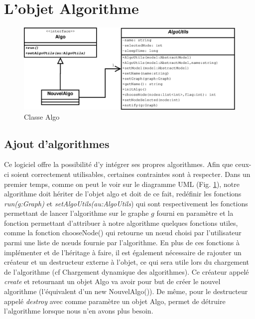 \documentclass[11pt,a4paper]{article}
\begin{document}
	\newpage
	\section{L'objet Algorithme}
		\begin{figure}[htbp]
			\begin{center}
				\includegraphics[scale=0.5]{class_algo.eps}
			\end{center}
			\caption{Classe Algo}
			\label{img_algo_class}
		\end{figure}	
				
		\subsection{Ajout d'algorithmes}
			Ce logiciel offre la possibilité d'y intégrer ses propres algorithmes. Afin que ceux-ci soient correctement utilisables, certaines contraintes sont à respecter. Dans un premier temps, comme on peut le voir sur le diagramme UML (Fig. \ref{img_algo_class}), notre algorithme doit hériter de l'objet algo et doit de ce fait, redéfinir les fonctions \textit{run(g:Graph)} et \textit{setAlgoUtils(au:AlgoUtils}) qui sont respectivement les fonctions permettant de lancer l'algorithme sur le graphe $g$ fourni en paramètre et la fonction permettant d'attribuer à notre algorithme quelques fonctions utiles, comme la fonction chooseNode() qui retourne un n\oe ud choisi par l'utilisateur parmi une liste de n\oe uds fournie par l'algorithme. En plus de ces fonctions à implémenter et de l'héritage à faire, il est également nécessaire de rajouter un créateur et un destructeur externe à l'objet, ce qui sera utile lors du chargement de l'algorithme (cf Chargement dynamique des algorithmes). Ce créateur appelé \textit{create} et retournant un objet Algo va avoir pour but de créer le nouvel algorithme (l'équivalent d'un new NouvelAlgo()). De même, pour le destructeur appelé \textit{destroy} avec comme paramètre un objet Algo, permet de détruire l'algorithme lorsque nous n'en avons plus besoin.
			
\end{document}
